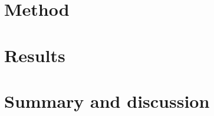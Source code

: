\documentclass[nocoverpage,swedish,g5paper]{thesis}
\begin{document}
\chapter{Method}\label{ch:Method}


%

%

\chapter{Results}\label{ch:Results}


\chapter{Summary and discussion}\label{ch:Summary}




%



\end{document}

